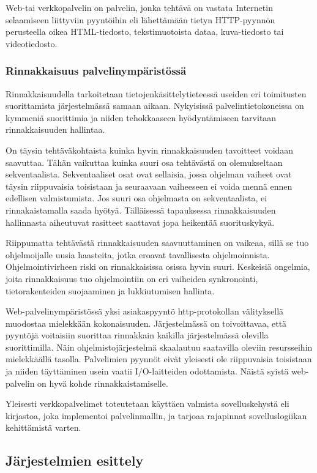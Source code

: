 \documentclass[12pt]{article}
\begin{document}
Web-tai verkkopalvelin on palvelin, jonka tehtävä on vastata Internetin
selaamiseen liittyviin pyyntöihin eli lähettämään tietyn HTTP-pyynnön
perusteella oikea HTML-tiedosto, tekstimuotoista dataa, kuva-tiedosto
tai videotiedosto.
\subsubsection{Rinnakkaisuus palvelinympäristössä}

Rinnakkaisuudella tarkoitetaan tietojenkäsittelytieteessä useiden
eri toimitusten suorittamista järjestelmässä samaan aikaan.
Nykyisissä palvelintietokoneissa on kymmeniä suorittimia ja niiden tehokkaaseen
hyödyntämiseen tarvitaan rinnakkaisuuden hallintaa.

On täysin tehtäväkohtaista
kuinka hyvin rinnakkaisuuden tavoitteet voidaan saavuttaa.
Tähän vaikuttaa kuinka suuri osa tehtävästä on olemukseltaan sekventaalista.
Sekventaaliset osat ovat sellaisia, jossa ohjelman vaiheet ovat täysin
riippuvaisia toisistaan ja seuraavaan vaiheeseen ei voida mennä ennen edellisen
valmistumista. Jos suuri osa ohjelmasta on sekventaalista, ei rinnakaistamalla
saada hyötyä. Tälläisessä tapauksessa rinnakkaisuuden hallinnasta aiheutuvat
rasitteet saattavat jopa heikentää suorituskykyä.

Riippumatta tehtävästä rinnakkaisuuden saavuuttaminen on vaikeaa,
sillä se tuo ohjelmoijalle uusia haasteita, jotka eroavat tavallisesta
ohjelmoinnista. Ohjelmointivirheen riski on rinnakkaisissa osissa hyvin suuri.
Keskeisiä ongelmia, joita rinnakkaisuus tuo ohjelmointiin on eri vaiheiden
synkronointi, tietorakenteiden suojaaminen ja lukkiutumisen hallinta.

Web-palvelinympäristössä yksi asiakaspyyntö http-protokollan välityksellä
muodostaa mielekkään kokonaisuuden.
Järjestelmässä on toivoittavaa, että pyyntöjä voitaisiin suorittaa
rinnakkain kaikilla järjestelmässä olevilla suorittimilla.
Näin ohjelmistojärjestelmä skaalautuu saatavilla oleviin resursseihin
mielekkäällä tasolla. Palvelimien pyynnöt eivät yleisesti ole riippuvaisia
toisistaan ja niiden täyttäminen usein vaatii I/O-laitteiden odottamista.
Näistä syistä web-palvelin on hyvä kohde rinnakkaistamiselle.

Yleisesti verkkopalvelimet toteutetaan käyttäen valmista sovelluskehystä eli kirjastoa,
joka implementoi palvelinmallin, ja tarjoaa rajapinnat sovelluslogiikan
kehittämistä varten.

\subsection{Järjestelmien esittely}
\end{document}
